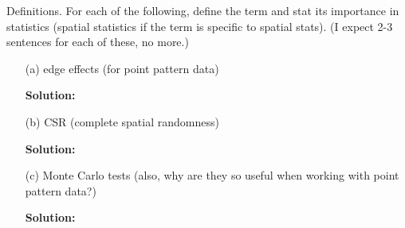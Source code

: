 \documentclass[12pt]{article}
\makeatletter
\theoremstyle{homework}
\newenvironment{exercise}[1]
{\def\@currentlabel{#1}\exercisecore}
{\endexercisecore}
\newcommand{\localhead}[1]{\par\smallskip\noindent\textbf{#1}\nobreak\\}%
\newcommand\solution{\localhead{Solution:}}
\makeatother
\begin{document}
\begin{exercise}{1} Definitions. For each of the following, define the term and stat its importance in statistics (spatial 
  statistics if the term is specific to spatial stats). (I expect 2-3 sentences for each of these, no more.)\\
  \begin{enumerate}
    \item[(a)] edge effects (for point pattern data)\\
    \solution 
    \vspace{.15in} 
    \item[(b)] CSR (complete spatial randomness)\\
    \solution 
    \vspace{.15in} 
    \item[(c)] Monte Carlo tests (also, why are they so useful when working with point pattern data?)\\
    \solution    
  \end{enumerate} 
\end{exercise}
\newpage
\end{document}
